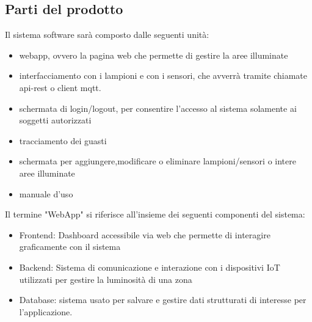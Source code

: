 \documentclass[12pt]{article}
\begin{document}
\subsection{Parti del prodotto}
Il sistema software sarà composto dalle seguenti unità:
\begin{itemize}
	\item webapp, ovvero la pagina web che permette di gestire la aree illuminate
	\item interfacciamento con i lampioni e con i sensori, che avverrà tramite chiamate api-rest o client mqtt.
	\item schermata di login/logout, per consentire l'accesso al sistema solamente ai soggetti autorizzati
	\item tracciamento dei guasti
	\item schermata per aggiungere,modificare o eliminare lampioni/sensori o intere aree illuminate
	\item manuale d'uso
\end{itemize}
Il termine "WebApp" si riferisce all'insieme dei seguenti componenti del sistema:
\begin{itemize}
	\item Frontend: Dashboard accessibile via web che permette di interagire graficamente con il sistema
	\item Backend: Sistema di comunicazione e interazione con i dispositivi IoT utilizzati per gestire la luminosità di una zona
	\item Database: sistema usato per salvare e gestire dati strutturati di interesse per l'applicazione.
\end{itemize}
\end{document}
